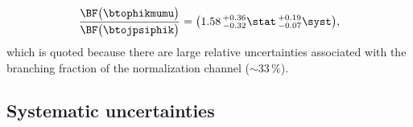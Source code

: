 \begin{equation}
  \frac{ \BF\big(\btophikmumu\big) }{ \BF\big(\btojpsiphik\big) }
  =\big(1.58\,^{+0.36}_{-0.32}\stat\,^{+0.19}_{-0.07}\syst\big),
\end{equation}
which is quoted because there are large relative uncertainties associated with the branching
fraction of the normalization channel ($\sim33\,\%$).











\subsection{Systematic uncertainties}
\label{ssec:phik:syst}
